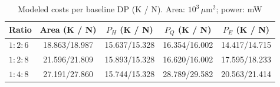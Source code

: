 \begin{table}[t]
\centering
\caption{Modeled costs per baseline DP (K / N). Area: $10^3\,\mu$m$^2$; power: mW}
\label{tab:kn_costs}
\begingroup\footnotesize\setlength{\tabcolsep}{2pt}
\begin{tabular*}{\columnwidth}{@{\extracolsep{\fill}}lcccc@{}}\toprule
Ratio & Area (K / N) & $P_H$ (K / N) & $P_Q$ (K / N) & $P_E$ (K / N) \\\midrule
$1:2:6$ & 18.863/18.987 & 15.637/15.328 & 16.354/16.002 & 14.417/14.715 \\
$1:2:8$ & 21.596/21.809 & 15.893/15.328 & 16.620/16.002 & 17.595/18.233 \\
$1:4:8$ & 27.191/27.860 & 15.744/15.328 & 28.789/29.582 & 20.563/21.414 \\
\bottomrule
\end{tabular*}\endgroup
\end{table}

